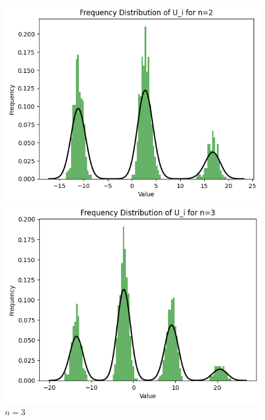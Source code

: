 \documentclass{article}
\begin{document}
\begin{figure}[H]
    \centering
    \begin{minipage}[b]{0.3\linewidth}
        \centering
        \includegraphics[width=\linewidth]{figure/n=2.png}
        \caption{$n=2$}
    \end{minipage}
    \hfill
    \begin{minipage}[b]{0.3\linewidth}
        \centering
        \includegraphics[width=\linewidth]{figure/n=3.png}
        \caption{$n=3$}
    \end{minipage}
    \hfill
    \begin{minipage}[b]{0.3\linewidth}
        \centering

\end{minipage}
\end{figure}
\end{document}
